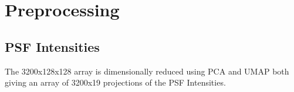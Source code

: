 \section{Preprocessing}

	\subsection{PSF Intensities}
		The 3200x128x128 array is dimensionally reduced using PCA and UMAP both giving an array of 3200x19 projections of the PSF Intensities.